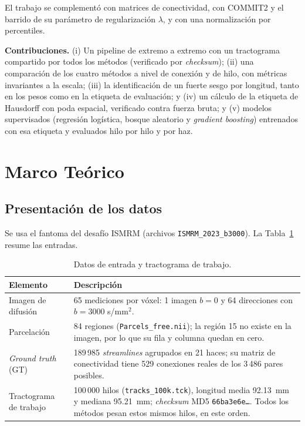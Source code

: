 \documentclass[11pt,a4paper]{article}
\newcommand{\code}[1]{\texttt{\small #1}}
\begin{document}
El trabajo se complement\'o con matrices de conectividad, con COMMIT2 y el barrido de su par\'ametro de regularizaci\'on $\lambda$, y con una normalizaci\'on por percentiles.

\textbf{Contribuciones.} (i) Un pipeline de extremo a extremo con un tractograma
compartido por todos los m\'etodos (verificado por \textit{checksum}); (ii) una comparaci\'on
de los cuatro m\'etodos a nivel de conexi\'on y de hilo, con m\'etricas invariantes a la
escala; (iii) la identificaci\'on de un fuerte sesgo por longitud, tanto en los pesos como
en la etiqueta de evaluaci\'on; y (iv) un c\'alculo de la etiqueta de Hausdorff con poda
espacial, verificado contra fuerza bruta; y (v) modelos supervisados (regresi\'on
log\'istica, bosque aleatorio y \textit{gradient boosting}) entrenados con esa etiqueta y
evaluados hilo por hilo y por haz.


\section{Marco Teórico}

\subsection{Presentación de los datos}

Se usa el fantoma del desaf\'io ISMRM (archivos \code{ISMRM\_2023\_b3000}). La
Tabla~\ref{tab:datos} resume las entradas.

\begin{table}[H]
\centering
\small
\begin{tabularx}{\textwidth}{@{}lX@{}}
\toprule
\textbf{Elemento} & \textbf{Descripci\'on}\\
\midrule
Imagen de difusi\'on & 65 mediciones por v\'oxel: 1 imagen $b=0$ y 64 direcciones con $b=3000$ s/mm$^2$.\\
Parcelaci\'on & 84 regiones (\code{Parcels\_free.nii}); la regi\'on 15 no existe en la imagen, por lo que su fila y columna quedan en cero.\\
\textit{Ground truth} (GT) & 189\,985 \textit{streamlines} agrupados en 21 haces; su matriz de conectividad tiene 529 conexiones reales de los 3\,486 pares posibles.\\
Tractograma de trabajo & 100\,000 hilos (\code{tracks\_100k.tck}), longitud media 92.13~mm y mediana 95.21~mm; \textit{checksum} MD5 \code{66ba3e6e\dots}. Todos los m\'etodos pesan estos mismos hilos, en este orden.\\
\bottomrule
\end{tabularx}
\caption{Datos de entrada y tractograma de trabajo.}
\label{tab:datos}
\end{table}
\end{document}
